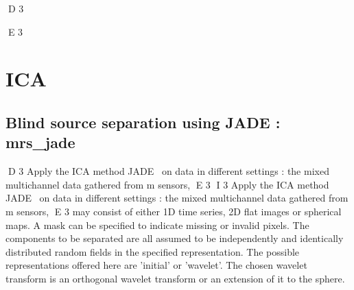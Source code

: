 D 3

E 3
\section{ICA}


\subsection{Blind source separation using JADE : mrs\_jade}

D 3
Apply the ICA method JADE~\cite{ica:jade} on data in different settings : the mixed multichannel data gathered from m sensors, 
E 3
I 3
Apply the ICA method JADE~\citep{ica:jade} on data in different settings : the mixed multichannel data gathered from m sensors, 
E 3
may consist of either 1D time series, 2D flat images or spherical maps. A mask can be specified to indicate missing or invalid 
pixels. The components to be separated are all assumed to be independently and identically distributed random fields in the 
specified representation. The possible representations offered here are 'initial' or 'wavelet'. The chosen wavelet transform 
is an orthogonal wavelet transform or an extension of it to the sphere.

